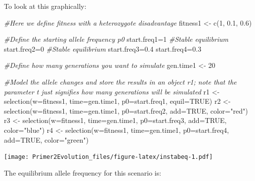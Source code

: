 \documentclass[
]{book}
\newenvironment{Shaded}{\begin{snugshade}}{\end{snugshade}}
\newcommand{\AttributeTok}[1]{\textcolor[rgb]{0.77,0.63,0.00}{#1}}
\newcommand{\CommentTok}[1]{\textcolor[rgb]{0.56,0.35,0.01}{\textit{#1}}}
\newcommand{\ConstantTok}[1]{\textcolor[rgb]{0.00,0.00,0.00}{#1}}
\newcommand{\DecValTok}[1]{\textcolor[rgb]{0.00,0.00,0.81}{#1}}
\newcommand{\FloatTok}[1]{\textcolor[rgb]{0.00,0.00,0.81}{#1}}
\newcommand{\FunctionTok}[1]{\textcolor[rgb]{0.00,0.00,0.00}{#1}}
\newcommand{\NormalTok}[1]{#1}
\newcommand{\OtherTok}[1]{\textcolor[rgb]{0.56,0.35,0.01}{#1}}
\newcommand{\StringTok}[1]{\textcolor[rgb]{0.31,0.60,0.02}{#1}}
\begin{document}
To look at this graphically:

\begin{Shaded}
\begin{Highlighting}[]
\CommentTok{\#Here we define fitness with a heterozygote disadvantage}
\NormalTok{fitness1 }\OtherTok{\textless{}{-}} \FunctionTok{c}\NormalTok{(}\DecValTok{1}\NormalTok{, }\FloatTok{0.1}\NormalTok{, }\FloatTok{0.6}\NormalTok{)}

\CommentTok{\#Define the starting allele frequency p0}
\NormalTok{start.freq1}\OtherTok{=}\DecValTok{1} \CommentTok{\#Stable equilibrium}
\NormalTok{start.freq2}\OtherTok{=}\DecValTok{0} \CommentTok{\#Stable equilibrium}
\NormalTok{start.freq3}\OtherTok{=}\FloatTok{0.4}
\NormalTok{start.freq4}\OtherTok{=}\FloatTok{0.3}

\CommentTok{\#Define how many generations you want to simulate}
\NormalTok{gen.time1 }\OtherTok{\textless{}{-}} \DecValTok{20}

\CommentTok{\#Model the allele changes and store the results in an object r1; note that the parameter t just signifies how many generations will be simulated}
\NormalTok{r1 }\OtherTok{\textless{}{-}} \FunctionTok{selection}\NormalTok{(}\AttributeTok{w=}\NormalTok{fitness1, }\AttributeTok{time=}\NormalTok{gen.time1, }\AttributeTok{p0=}\NormalTok{start.freq1, }\AttributeTok{equil=}\ConstantTok{TRUE}\NormalTok{)}
\NormalTok{r2 }\OtherTok{\textless{}{-}} \FunctionTok{selection}\NormalTok{(}\AttributeTok{w=}\NormalTok{fitness1, }\AttributeTok{time=}\NormalTok{gen.time1, }\AttributeTok{p0=}\NormalTok{start.freq2, }\AttributeTok{add=}\ConstantTok{TRUE}\NormalTok{, }\AttributeTok{color=}\StringTok{"red"}\NormalTok{)}
\NormalTok{r3 }\OtherTok{\textless{}{-}} \FunctionTok{selection}\NormalTok{(}\AttributeTok{w=}\NormalTok{fitness1, }\AttributeTok{time=}\NormalTok{gen.time1, }\AttributeTok{p0=}\NormalTok{start.freq3, }\AttributeTok{add=}\ConstantTok{TRUE}\NormalTok{, }\AttributeTok{color=}\StringTok{"blue"}\NormalTok{)}
\NormalTok{r4 }\OtherTok{\textless{}{-}} \FunctionTok{selection}\NormalTok{(}\AttributeTok{w=}\NormalTok{fitness1, }\AttributeTok{time=}\NormalTok{gen.time1, }\AttributeTok{p0=}\NormalTok{start.freq4, }\AttributeTok{add=}\ConstantTok{TRUE}\NormalTok{, }\AttributeTok{color=}\StringTok{"green"}\NormalTok{)}
\end{Highlighting}
\end{Shaded}

\texttt{[image: Primer2Evolution\_files/figure-latex/instabeq-1.pdf]}

The equilibrium allele frequency for this scenario is:
\end{document}
